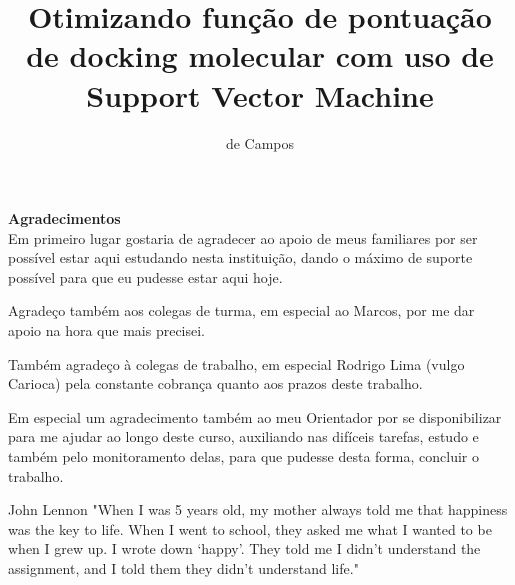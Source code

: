 \documentclass[tcc, capa]{texucpel}
\title{Otimizando função de pontuação de docking molecular com uso de Support Vector Machine }
\author{de Campos}{Gianluca}
\begin{document}
\maketitle 
\renewcommand{\advisorname}
{Orientador}          
\sloppy
\fichacatalografica
\folhadeaprovacao

\begin{agradecimentos}
\textbf{Agradecimentos} \\
Em primeiro lugar gostaria de agradecer ao apoio de meus familiares por ser possível estar aqui estudando nesta instituição, dando o máximo de suporte possível para que eu pudesse estar aqui hoje.

Agradeço também aos colegas de turma, em especial ao Marcos, por me dar apoio na hora que mais precisei.

Também agradeço à colegas de trabalho, em especial Rodrigo Lima (vulgo Carioca) pela constante cobrança quanto aos prazos deste trabalho.

Em especial um agradecimento também ao meu Orientador por se disponibilizar para me ajudar ao longo deste curso, auxiliando nas difíceis tarefas, estudo e também pelo monitoramento delas, para que pudesse desta forma, concluir o trabalho.
\vspace{\baselineskip}
\end{agradecimentos}


\begin{epigrafe}{John Lennon}
"When I was 5 years old, my mother always told me that happiness was the key to life. When I went to school, they asked me what I wanted to be when I grew up. I wrote down ‘happy’. They told me I didn’t understand the assignment, and I told them they didn’t understand life."\\
\end{epigrafe}
\end{document}
